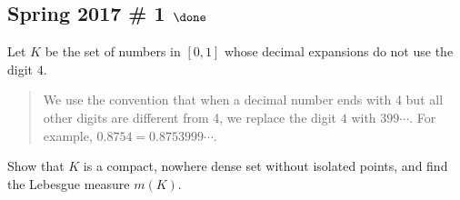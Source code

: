 \hypertarget{spring-2017-1-done}{%
\subsection{\texorpdfstring{Spring 2017 \# 1
\(\done\)}{Spring 2017 \# 1 \textbackslash done}}\label{spring-2017-1-done}}

Let \(K\) be the set of numbers in \([0, 1]\) whose decimal expansions
do not use the digit \(4\).

\begin{quote}
We use the convention that when a decimal number ends with 4 but all
other digits are different from 4, we replace the digit \(4\) with
\(399\cdots\). For example, \(0.8754 = 0.8753999\cdots\).
\end{quote}

Show that \(K\) is a compact, nowhere dense set without isolated points,
and find the Lebesgue measure \(m(K)\).

